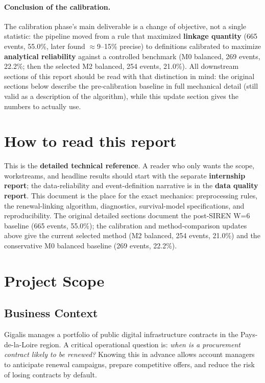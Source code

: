 \documentclass[12pt, a4paper]{article}
\begin{document}
\paragraph{Conclusion of the calibration.}
The calibration phase's main deliverable is a change of objective, not a single
statistic: the pipeline moved from a rule that maximized \textbf{linkage
quantity} (665 events, 55.0\%, later found $\approx$9--15\% precise) to
definitions calibrated to maximize \textbf{analytical reliability} against a
controlled benchmark (M0 balanced, 269 events, 22.2\%; then the selected M2
balanced, 254 events, 21.0\%). All downstream sections of this report should
be read with that distinction in mind: the original sections below describe the
pre-calibration baseline in full mechanical detail (still valid as a
description of the algorithm), while this update section gives the numbers to
actually use.

\section*{How to read this report}

This is the \textbf{detailed technical reference}. A reader who only wants the
scope, workstreams, and headline results should start with the separate
\textbf{internship report}; the data-reliability and event-definition narrative
is in the \textbf{data quality report}. This document is the place for the exact
mechanics: preprocessing rules, the renewal-linking algorithm, diagnostics,
survival-model specifications, and reproducibility. The original detailed
sections document the post-SIREN W=6 baseline (665 events, 55.0\%); the
calibration and method-comparison updates above give the current selected
method (M2 balanced, 254 events, 21.0\%) and the conservative M0 balanced
baseline (269 events, 22.2\%).

\tableofcontents
\newpage

\section{Project Scope}

\subsection{Business Context}

Gigalis manages a portfolio of public digital infrastructure contracts in the
Pays-de-la-Loire region. A critical operational question is: \textit{when is a
procurement contract likely to be renewed?} Knowing this in advance allows
account managers to anticipate renewal campaigns, prepare competitive offers,
and reduce the risk of losing contracts by default.
\end{document}

